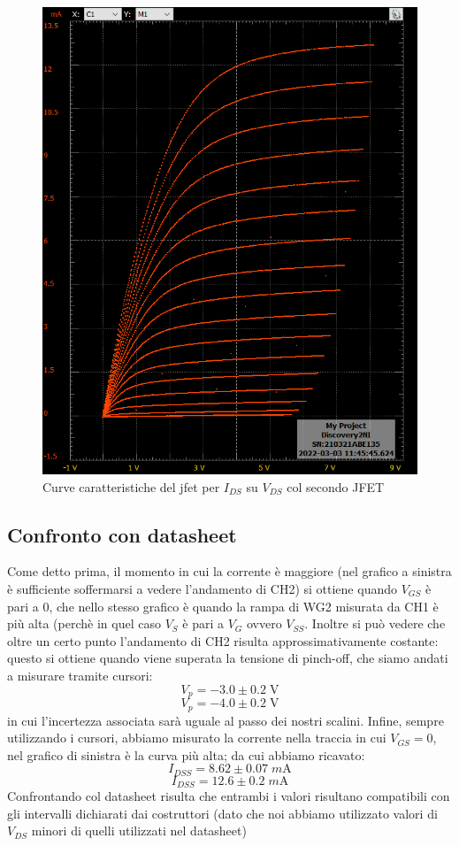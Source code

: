 \documentclass[10pt, a4paper, italian]{article}
\begin{document}
\begin{figure}[htbp]
    \centering
	\includegraphics[scale=0.4]{vgs}
    \caption{Curve caratteristiche del jfet per $I_{DS}$ su $V_{DS}$ col secondo JFET}
\end{figure}
\subsection{Confronto con datasheet}
Come detto prima, il momento in cui la corrente è maggiore (nel grafico a sinistra è sufficiente soffermarsi a vedere l'andamento di CH2) si ottiene quando $V_{GS}$ è pari a 0, che nello stesso grafico è quando la rampa di WG2 misurata da CH1 è più alta (perchè in quel caso $V_S$ è pari a $V_G$ ovvero $V_{SS}$.
Inoltre si può vedere che oltre un certo punto l'andamento di CH2 risulta approssimativamente costante: questo si ottiene quando viene superata la tensione di pinch-off, che siamo andati a misurare tramite cursori:
\[
V_p = -3.0 \pm 0.2 \; \si{\V}
\]
\[
V_p = -4.0 \pm 0.2 \; \si{\V}
\]
in cui l'incertezza associata sarà uguale al passo dei nostri scalini.
Infine, sempre utilizzando i cursori, abbiamo misurato la corrente nella traccia in cui $V_{GS} = 0$, nel grafico di sinistra è la curva più alta; da cui abbiamo ricavato:
\[
I_{DSS} = 8.62 \pm 0.07 \; \si{m\A}
\]
\[
I_{DSS} = 12.6 \pm 0.2 \; \si{m\A}
\]
Confrontando col datasheet risulta che entrambi i valori risultano compatibili con gli intervalli dichiarati dai costruttori (dato che noi abbiamo utilizzato valori di $V_{DS}$ minori di quelli utilizzati nel datasheet)
\end{document}
